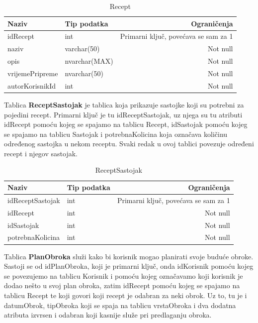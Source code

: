 \documentclass[diplomskirad]{fer}
\begin{document}
\begin{table}[H]
\label{tbl:Recept}
\centering
\renewcommand{\arraystretch}{1.3}
\begin{tabular}{llr} \hline
Naziv & Tip podatka & Ograničenja\\ \hline
idRecept & int & Primarni ključ, povećava se sam za 1 \\
naziv & varchar(50) & Not null\\
opis & nvarchar(MAX) & Not null\\
vrijemePripreme & nvarchar(50) & Not null\\
autorKorisnikId & int & Not null\\
\end{tabular}
\caption{Recept}
\end{table}

Tablica \textbf{ReceptSastojak} je tablica koja prikazuje sastojke koji su potrebni za pojedini recept. Primarni ključ je tu idReceptSastojak, uz njega su tu atributi idRecept pomoću kojeg se spajamo na tablicu Recept, idSastojak pomoću kojeg se spajamo na tablicu Sastojak i potrebnaKolicina koja označava količinu određenog sastojka u nekom receptu. Svaki redak u ovoj tablici povezuje određeni recept i njegov sastojak.

\begin{table}[H]
\label{tbl:ReceptSastojak}
\centering
\renewcommand{\arraystretch}{1.3}
\begin{tabular}{llr} \hline
Naziv & Tip podatka & Ograničenja\\ \hline
idReceptSastojak & int & Primarni ključ, povećava se sam za 1 \\
idRecept & int & Not null\\
idSastojak & int & Not null\\
potrebnaKolicina & int & Not null\\
\end{tabular}
\caption{ReceptSastojak}
\end{table}

Tablica \textbf{PlanObroka} služi kako bi korisnik mogao planirati svoje buduće obroke. Sastoji se od idPlanObroka, koji je primarni ključ, onda idKorisnik pomoću kojeg se povezujemo na tablicu Korisnik i pomoću kojeg označavamo koji korisnik je dodao nešto u svoj plan obroka, zatim idRecept pomoću kojeg se spajamo na tablicu Recept te koji govori koji recept je odabran za neki obrok. Uz to, tu je i datumObrok, tipObroka koji se spaja na tablicu vrstaObroka i dva dodatna atributa izvrsen i odabran koji kasnije služe pri predlaganju obroka. 
\end{document}

